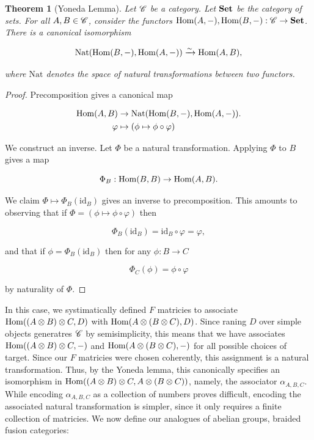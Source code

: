 \documentclass{article}
\newtheorem{theorem}{Theorem}[section]
\theoremstyle{definition}
\numberwithin{figure}{section}
\begin{document}
\begin{theorem}[Yoneda Lemma] Let $\mathscr{C}$ be a category. Let $\bold{Set}$ be the category of sets. For all $A,B\in \mathscr{C}$, consider the functors $\mathrm{Hom}(A,\--),\mathrm{Hom}(B,\--):\mathscr{C}\to \bold{Set}$. There is a canonical isomorphism

$$\mathrm{Nat}(\mathrm{Hom}(B,\--),\mathrm{Hom}(A,\--))\xrightarrow{\sim}\mathrm{Hom}(A,B),$$

where $\mathrm{Nat}$ denotes the space of natural transformations between two functors.
\end{theorem}
\begin{proof} Precomposition gives a canonical map

\begin{align*}
\mathrm{Hom}(A,B)&\to \mathrm{Nat}(\mathrm{Hom}(B,\--),\mathrm{Hom}(A,\--)).\\
\varphi &\mapsto \left(\phi \mapsto \phi\circ \varphi\right)
\end{align*}

We construct an inverse. Let $\Phi$ be a natural transformation. Applying $\Phi$ to $B$ gives a map

$$\Phi_B: \mathrm{Hom}(B,B)\to \mathrm{Hom}(A,B).$$

We claim $\Phi\mapsto \Phi_B(\text{id}_B)$ gives an inverse to precomposition. This amounts to observing that if $\Phi=(\phi\mapsto \phi\circ \varphi)$ then

$$\Phi_B(\text{id}_B)=\text{id}_{B}\circ \varphi=\varphi,$$

and that if $\phi=\Phi_B(\text{id}_B)$ then for any $\phi: B\to C$

$$\Phi_C(\phi)=\phi\circ \varphi$$

by naturality of $\Phi$.
\end{proof}

In this case, we systimatically defined $F$ matricies to associate  $\mathrm{Hom}((A\otimes B)\otimes C,D)$ with $\mathrm{Hom}(A\otimes (B\otimes C),D)$. Since raning $D$ over simple objects generatres $\mathscr{C}$ by semisimplicity, this means that we have associates $\mathrm{Hom}((A\otimes B)\otimes C,\--)$ and $\mathrm{Hom}(A\otimes (B\otimes C),\--)$ for all possible choices of target. Since our $F$ matricies were chosen coherently, this assignment is a natural transformation. Thus, by the Yoneda lemma, this canonically specifies an isomorphism in $\mathrm{Hom}((A\otimes B)\otimes C,A\otimes (B\otimes C))$, namely, the associator $\alpha_{A,B,C}$. While encoding $\alpha_{A,B,C}$ as a collection of numbers proves difficult, encoding the associated natural transformation is simpler, since it only requires a finite collection of matricies. We now define our analogues of abelian groups, braided fusion categories:
\end{document}
